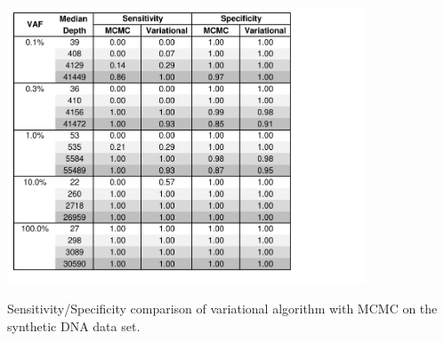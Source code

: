 \documentclass[11pt,reqno]{amsart}
\begin{document}


\begin{table}[h]
\centering
\includegraphics[width=0.8\textwidth]{tables/statistics_mcmc_var.pdf}
\caption{Sensitivity/Specificity comparison of variational algorithm with MCMC on the synthetic DNA data set.}
\label{tbl:statistics_mcmc_var}
\end{table}

\end{document}
